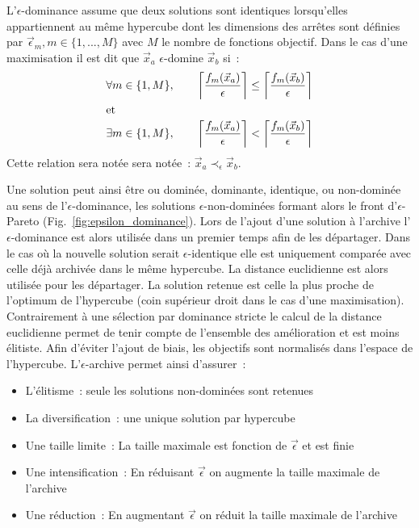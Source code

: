 \begin{Def}\label{def:eps_dominance}
L’$\epsilon$-dominance assume que deux solutions sont identiques lorsqu’elles appartiennent
au même hypercube dont les dimensions des arrêtes sont définies par
$\vec{\epsilon}_{m}, m \in \{1, ..., M\}$ avec $M$ le nombre de fonctions objectif.
Dans le cas d’une maximisation il est dit que $\vec{x}_{a}$ $\epsilon$-domine $\vec{x}_{b}$ si~:
\begin{align*}
  \forall m \in \{1, M\}, \qquad
  \left\lceil\frac{f_{m}(\vec{x}_{a})}{\epsilon}\right\rceil &\leq
  \left\lceil\frac{f_{m}(\vec{x}_{b})}{\epsilon}\right\rceil  \\
  \intertext{et}
  \exists m \in \{1, M\}, \qquad
  \left\lceil\frac{f_{m}(\vec{x}_{a})}{\epsilon}\right\rceil &<
  \left\lceil\frac{f_{m}(\vec{x}_{b})}{\epsilon}\right\rceil  \\
\end{align*}
Cette relation sera notée sera notée~: $\vec{x}_{a} \prec_{\epsilon} \vec{x}_{b}$.
\end{Def}

Une solution peut ainsi être ou dominée, dominante, identique, ou non-dominée au sens de
l’$\epsilon$-dominance, les solutions $\epsilon$-non-dominées formant alors le front
d’$\epsilon$-Pareto (Fig.~\ref{fig:epsilon_dominance}). Lors de l’ajout d’une solution à
l’archive l’$\epsilon$-dominance est alors utilisée dans un premier temps afin de les
départager. Dans le cas où la nouvelle solution serait $\epsilon$-identique elle est
uniquement comparée avec celle déjà archivée dans le même hypercube. La distance
euclidienne est alors utilisée pour les départager. La solution retenue est celle la plus
proche de l’optimum de l’hypercube (coin supérieur droit dans le cas d’une maximisation).
Contrairement à une sélection par dominance stricte le calcul de la distance euclidienne
permet de tenir compte de l’ensemble des amélioration et est moins élitiste. Afin d’éviter
l’ajout de biais, les objectifs sont normalisés dans l’espace de l’hypercube.
L’$\epsilon$-archive permet ainsi d’assurer~:
\begin{itemize}
  \item L’élitisme~: seule les solutions non-dominées sont retenues
  \item La diversification~: une unique solution par hypercube
  \item Une taille limite~: La taille maximale est fonction de $\vec{\epsilon}$ et est finie
  \item Une intensification~: En réduisant $\vec{\epsilon}$ on augmente la taille maximale de l’archive
  \item Une réduction~: En augmentant $\vec{\epsilon}$ on réduit la taille maximale de l’archive
\end{itemize}

